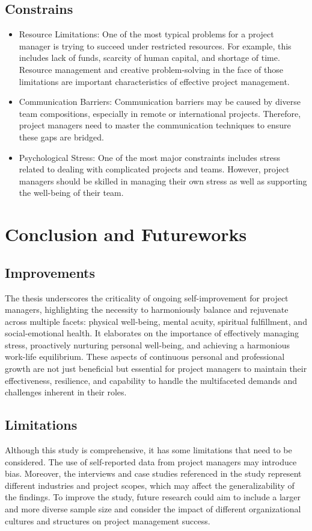 \documentclass{article}
\begin{document}
\subsection{Constrains}
\begin{itemize}
    \item Resource Limitations: One of the most typical problems for a project manager is trying to succeed under restricted resources. For example, this includes lack of funds, scarcity of human capital, and shortage of time. Resource management and creative problem-solving in the face of those limitations are important characteristics of effective project management\cite{relationship_between_project_manage}.
    \item Communication Barriers: Communication barriers may be caused by diverse team compositions, especially in remote or international projects. Therefore, project managers need to master the communication techniques to ensure these gaps are bridged\cite{Warner_Mark}.
    \item Psychological Stress: One of the most major constraints includes stress related to dealing with complicated projects and teams. However, project managers should be skilled in managing their own stress as well as supporting the well-being of their team\cite{Project_Management_Techniques}.
\end{itemize}

\newpage
\section{Conclusion and Futureworks}
\subsection{Improvements}
The thesis underscores the criticality of ongoing self-improvement for project managers, highlighting the necessity to harmoniously balance and rejuvenate across multiple facets: physical well-being, mental acuity, spiritual fulfillment, and social-emotional health. It elaborates on the importance of effectively managing stress, proactively nurturing personal well-being, and achieving a harmonious work-life equilibrium. These aspects of continuous personal and professional growth are not just beneficial but essential for project managers to maintain their effectiveness, resilience, and capability to handle the multifaceted demands and challenges inherent in their roles\cite{Patterns}.

\subsection{Limitations}
Although this study is comprehensive, it has some limitations that need to be considered. The use of self-reported data from project managers may introduce bias. Moreover, the interviews and case studies referenced in the study represent different industries and project scopes, which may affect the generalizability of the findings. To improve the study, future research could aim to include a larger and more diverse sample size and consider the impact of different organizational cultures and structures on project management success\cite{Project_Management_Techniques}.
\end{document}
